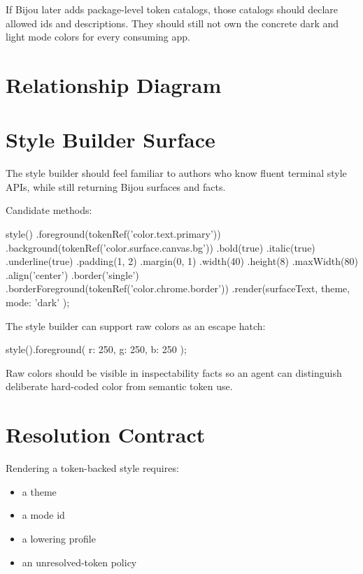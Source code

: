 If Bijou later adds package-level token catalogs, those catalogs should declare allowed ids and descriptions. They should still not own the concrete dark and light mode colors for every consuming app.

\section{Relationship Diagram}\label{record-178-relationship-diagram}



\section{Style Builder Surface}\label{record-178-style-builder-surface}

The style builder should feel familiar to authors who know fluent terminal style APIs, while still returning Bijou surfaces and facts.

Candidate methods:

\begin{CodeBlock}
style()
  .foreground(tokenRef('color.text.primary'))
  .background(tokenRef('color.surface.canvas.bg'))
  .bold(true)
  .italic(true)
  .underline(true)
  .padding(1, 2)
  .margin(0, 1)
  .width(40)
  .height(8)
  .maxWidth(80)
  .align('center')
  .border('single')
  .borderForeground(tokenRef('color.chrome.border'))
  .render(surfaceText, { theme, mode: 'dark' });
\end{CodeBlock}

The style builder can support raw colors as an escape hatch:

\begin{CodeBlock}
style().foreground({ r: 250, g: 250, b: 250 });
\end{CodeBlock}

Raw colors should be visible in inspectability facts so an agent can distinguish deliberate hard-coded color from semantic token use.

\section{Resolution Contract}\label{record-178-resolution-contract}

Rendering a token-backed style requires:

\begin{itemize}
\tightlist
\item
  a theme
\item
  a mode id
\item
  a lowering profile
\item
  an unresolved-token policy
\end{itemize}

